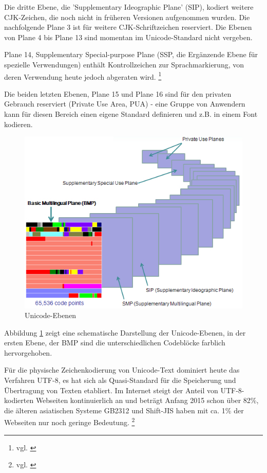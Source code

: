 Die dritte Ebene, die 'Supplementary Ideographic Plane' (SIP), kodiert weitere CJK-Zeichen, die noch nicht in früheren Versionen aufgenommen wurden.
Die nachfolgende Plane 3 ist für weitere CJK-Schriftzeichen reserviert.
Die Ebenen von Plane 4 bis Plane 13 sind momentan im Unicode-Standard nicht vergeben.

Plane 14, Supplementary Special-purpose Plane (SSP, die Ergänzende Ebene für spezielle Verwendungen) enthält Kontrollzeichen zur Sprachmarkierung, von deren Verwendung heute jedoch abgeraten wird. \footnote{vgl. \cite{UC2014B}}

Die beiden letzten Ebenen, Plane 15 und Plane 16 sind für den privaten Gebrauch reserviert (Private Use Area, PUA) - eine Gruppe von Anwendern kann für diesen Bereich einen eigene Standard definieren und z.B. in einem Font kodieren.

\begin{figure}[h]
\centering
\includegraphics[width=.67\textwidth]{img/unicodeplanes.png}
\caption[Unicode-Ebenen]{Unicode-Ebenen\footnotemark}
\label{UnicodePlanes}
\end{figure}

Abbildung \ref{UnicodePlanes} zeigt eine schematische Darstellung der Unicode-Ebenen, in der ersten Ebene, der BMP sind die unterschiedlichen Codeblöcke farblich hervorgehoben.

Für die physische Zeichenkodierung von Unicode-Text dominiert heute das Verfahren UTF-8, es hat sich als Quasi-Standard für die Speicherung und Übertragung von Texten etabliert. Im Internet steigt der Anteil von UTF-8-kodierten Webseiten kontinuierlich an und beträgt Anfang 2015 schon über 82\%, die älteren asiatischen Systeme GB2312 und Shift-JIS haben mit ca. 1\% der Webseiten nur noch geringe Bedeutung. \footnote{vgl. \cite{W3Tech}}


